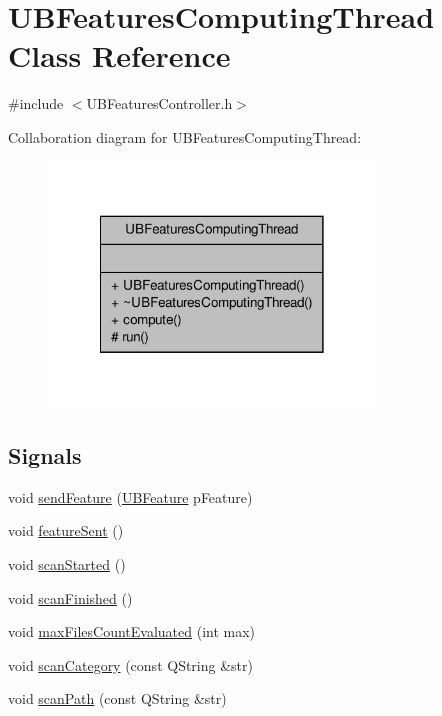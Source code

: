 \hypertarget{class_u_b_features_computing_thread}{\section{U\-B\-Features\-Computing\-Thread Class Reference}
\label{d5/db4/class_u_b_features_computing_thread}
}


{\ttfamily \#include $<$U\-B\-Features\-Controller.\-h$>$}



Collaboration diagram for U\-B\-Features\-Computing\-Thread\-:
\nopagebreak
\begin{figure}[H]
\begin{center}
\leavevmode
\includegraphics[width=246pt]{d5/d36/class_u_b_features_computing_thread__coll__graph}
\end{center}
\end{figure}
\subsection*{Signals}
\begin{DoxyCompactItemize}
\item 
void \hyperlink{class_u_b_features_computing_thread_a2b061106d73a7810a2b2429b6957096d}{send\-Feature} (\hyperlink{class_u_b_feature}{U\-B\-Feature} p\-Feature)
\item 
void \hyperlink{class_u_b_features_computing_thread_a03e3d3508cc2b93e61522969eb1d16c0}{feature\-Sent} ()
\item 
void \hyperlink{class_u_b_features_computing_thread_ac13bf6649253592358c59e707b821cc5}{scan\-Started} ()
\item 
void \hyperlink{class_u_b_features_computing_thread_adf7a2677fe2c04c70605a5adf0c820ed}{scan\-Finished} ()
\item 
void \hyperlink{class_u_b_features_computing_thread_ab8feb675f13992b1e38cf190ef0f0e3f}{max\-Files\-Count\-Evaluated} (int max)
\item 
void \hyperlink{class_u_b_features_computing_thread_ac17a85b57f0817af9c0c3733de201c75}{scan\-Category} (const Q\-String \&str)
\item 
void \hyperlink{class_u_b_features_computing_thread_a3015e0ffcd33006e07a6780f44bf929a}{scan\-Path} (const Q\-String \&str)
\end{DoxyCompactItemize}
